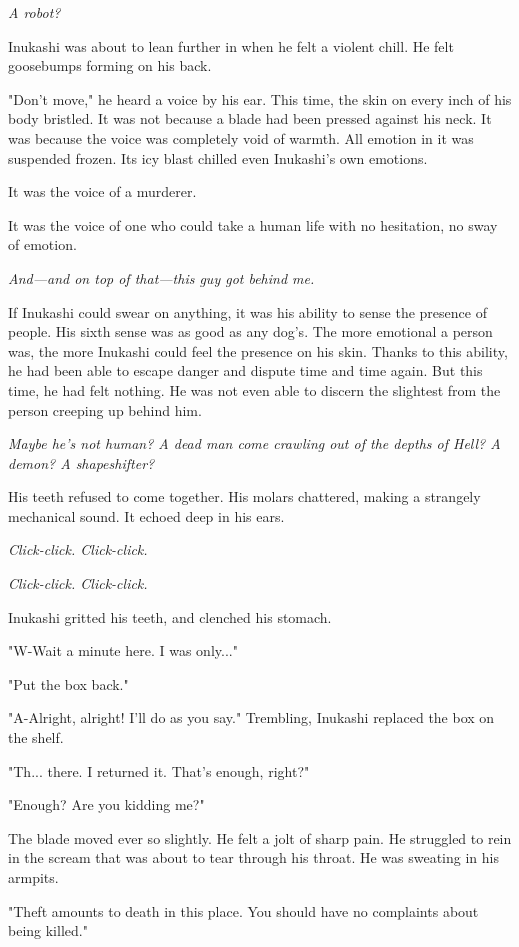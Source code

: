 \emph{A robot?}

Inukashi was about to lean further in when he felt a violent chill. He
felt goosebumps forming on his back.

"Don't move," he heard a voice by his ear. This time, the skin on every
inch of his body bristled. It was not because a blade had been pressed
against his neck. It was because the voice was completely void of
warmth. All emotion in it was suspended frozen. Its icy blast chilled
even Inukashi's own emotions.

It was the voice of a murderer.

It was the voice of one who could take a human life with no hesitation,
no sway of emotion.

\emph{And---and on top of that---this guy got behind me.}

If Inukashi could swear on anything, it was his ability to sense the
presence of people. His sixth sense was as good as any dog's. The more
emotional a person was, the more Inukashi could feel the presence on his
skin. Thanks to this ability, he had been able to escape danger and
dispute time and time again. But this time, he had felt nothing. He was
not even able to discern the slightest from the person creeping up
behind him.

\emph{Maybe he's not human? A dead man come crawling out of the depths of
Hell? A demon? A shapeshifter?}

His teeth refused to come together. His molars chattered, making a
strangely mechanical sound. It echoed deep in his ears.

\emph{Click-click. Click-click.}

\emph{Click-click. Click-click.}

Inukashi gritted his teeth, and clenched his stomach.

"W-Wait a minute here. I was only..."

"Put the box back."

"A-Alright, alright! I'll do as you say." Trembling, Inukashi replaced
the box on the shelf.

"Th... there. I returned it. That's enough, right?"

"Enough? Are you kidding me?"

The blade moved ever so slightly. He felt a jolt of sharp pain. He
struggled to rein in the scream that was about to tear through his
throat. He was sweating in his armpits.

"Theft amounts to death in this place. You should have no complaints
about being killed."

